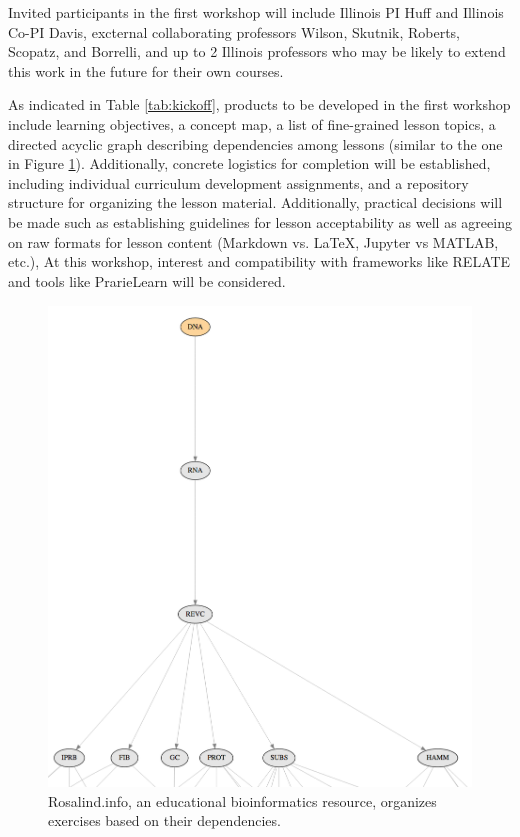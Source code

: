 \documentclass[11pt]{article}
\begin{document}
          Invited participants in the first workshop will include Illinois PI Huff 
          and Illinois Co-PI Davis, excternal collaborating professors Wilson, 
          Skutnik, Roberts, Scopatz, and Borrelli, and up to 2 Illinois professors 
          who may be likely to extend this work in the future for their own 
          courses.

          As indicated in Table \ref{tab:kickoff}, products to be developed in the first workshop include learning 
          objectives\cite{bloom_bloom_1984}, a concept 
          map\cite{novak_concept_1990}, a list of fine-grained lesson topics, a 
          directed acyclic graph describing dependencies among lessons (similar 
          to the one in Figure \ref{fig:rosalind}). Additionally, concrete logistics 
          for completion will be established, including individual curriculum 
          development assignments, and a repository structure for organizing 
          the lesson material. Additionally, practical decisions will be made 
          such as establishing guidelines for lesson acceptability as well as 
          agreeing on raw formats for lesson content (Markdown vs. \LaTeX, 
          Jupyter vs MATLAB, etc.),  At this workshop, interest and 
          compatibility with frameworks like RELATE 
          \cite{kloeckner_relate_2017,kloeckner_relate_2017-1} and tools like 
          PrarieLearn \cite{west_prairielearn:_2015} will be considered.

\begin{figure}[ht!]
        \begin{center}
                \includegraphics[height=0.5\textheight]{rosalind.png}
        \end{center}
        \caption{Rosalind.info, an educational bioinformatics resource, 
        organizes exercises based on their dependencies.}
        \label{fig:rosalind}
\end{figure}
          
\end{document}
